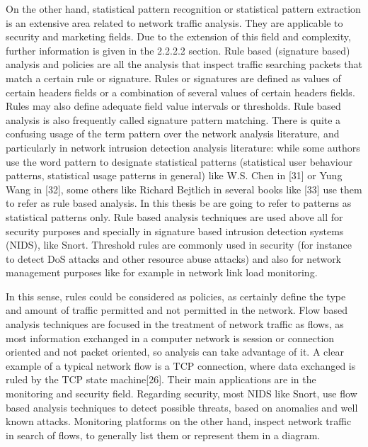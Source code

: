 \documentclass[thesis=M,english]{FITthesis}[2011/07/15]
\begin{document}
On the other hand, statistical pattern recognition or statistical pattern extraction is an extensive area related to network traffic analysis. They are applicable to security and
marketing fields. Due to the extension of this field and complexity, further information is given in the 2.2.2.2 section. Rule based (signature based) analysis and policies are all the analysis that inspect traffic searching packets that match a certain rule or signature. Rules or signatures are defined as values of certain headers fields or a combination of several values of certain headers fields. Rules may also define adequate field value intervals or thresholds. Rule based analysis is also frequently called signature pattern matching. There is quite a confusing usage of the term pattern over the network analysis literature, and particularly in network intrusion detection analysis literature: while some authors use the word pattern to designate statistical patterns (statistical user behaviour patterns, statistical usage patterns in general) like W.S. Chen in [31] or Yung Wang in [32], some others like Richard Bejtlich in several books like [33] use them to refer as rule based analysis. In this thesis be are going to refer to patterns as statistical patterns only. Rule based analysis techniques are used above all for security purposes and specially in signature based intrusion detection systems (NIDS), like Snort. Threshold rules are commonly used in security (for instance to detect DoS attacks and other resource abuse attacks) and also for network management purposes like for example in network link load monitoring.

In this sense, rules could be considered as policies, as certainly define the type and amount of traffic permitted and not permitted in the network. Flow based analysis techniques are focused in the treatment of network traffic as flows, as most information exchanged in a computer network is session or connection oriented and not packet oriented, so analysis can take advantage of it. A clear example of a typical network flow is a TCP connection, where data exchanged is ruled by the TCP state machine[26].
Their main applications are in the monitoring and security field. Regarding security, most NIDS like Snort, use flow based analysis techniques to detect possible threats, based on anomalies and well known attacks. Monitoring platforms on the other hand, inspect network traffic in search of flows, to generally list them or represent them in a diagram.
\end{document}
